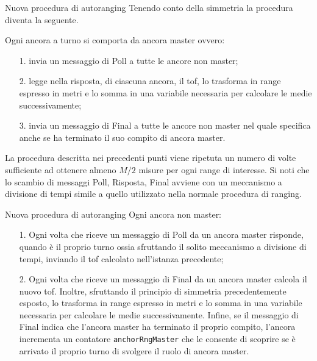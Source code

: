 \begin{frame}[shrink=10]{Nuova procedura di autoranging}
  Tenendo conto della simmetria la procedura diventa la seguente.
  \par
  Ogni ancora \alert{a turno} si comporta da ancora \alert{master}  ovvero:
  \begin{itemize}
  \item [1.] invia un messaggio di Poll a tutte le ancore \alert{non} master;
  \item [2.] legge nella risposta, di ciascuna ancora, il tof, lo trasforma in range espresso in metri e lo somma
    in una variabile necessaria per calcolare le medie successivamente;
  \item [3.] invia un messaggio di Final a tutte le ancore \alert{non} master nel quale specifica anche se ha terminato il suo compito
    di ancora master.
  \end{itemize}
  La procedura descritta nei precedenti punti viene ripetuta un numero di volte sufficiente ad ottenere almeno $M/2$ misure per
  ogni range di interesse. Si noti che lo scambio di messaggi Poll, Risposta, Final avviene con un meccanismo a divisione di tempi simile
  a quello utilizzato nella normale procedura di ranging.
\end{frame}

\begin{frame}[shrink = 10]{Nuova procedura di autoranging}
  Ogni ancora \alert{non} master:
  \begin{itemize}
  \item [1.] Ogni volta che riceve un messaggio di Poll da un ancora master risponde, quando è il proprio turno
    ossia sfruttando il solito meccanismo a divisione di tempi, inviando il tof calcolato nell'istanza precedente;
  \item [2.] Ogni volta che riceve un messaggio di Final da un ancora master calcola il nuovo tof. Inoltre,
    sfruttando il principio di simmetria precedentemente esposto, lo trasforma in range espresso in metri e lo somma
    in una variabile necessaria per calcolare le medie successivamente. Infine, se il messaggio di Final indica che l'ancora master
    ha terminato il proprio compito, l'ancora incrementa un contatore \lstinline!anchorRngMaster! che le consente di scoprire se è arrivato il proprio turno di svolgere il ruolo di ancora master.
  \end{itemize}
\end{frame}

